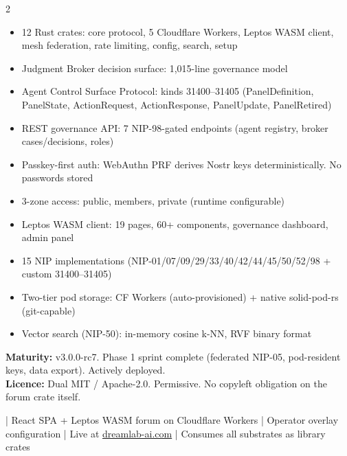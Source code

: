 \documentclass[10pt,a4paper]{article}
\begin{document}
\begin{multicols}{2}
{\color{gold}\faBalanceScale}\;\\[2pt]
{\small
\begin{itemize}[leftmargin=8pt,itemsep=0pt,parsep=0pt,topsep=1pt,label={\color{gold}\textbullet}]
  \item 12 Rust crates: core protocol, 5 Cloudflare Workers, Leptos WASM client, mesh federation, rate limiting, config, search, setup
  \item Judgment Broker decision surface: 1,015-line governance model
  \item Agent Control Surface Protocol: kinds 31400--31405 (PanelDefinition, PanelState, ActionRequest, ActionResponse, PanelUpdate, PanelRetired)
  \item REST governance API: 7 NIP-98-gated endpoints (agent registry, broker cases/decisions, roles)
  \item Passkey-first auth: WebAuthn PRF derives Nostr keys deterministically. No passwords stored
  \item 3-zone access: public, members, private (runtime configurable)
  \item Leptos WASM client: 19 pages, 60+ components, governance dashboard, admin panel
  \item 15 NIP implementations (NIP-01/07/09/29/33/40/42/44/45/50/52/98 + custom 31400--31405)
  \item Two-tier pod storage: CF Workers (auto-provisioned) + native solid-pod-rs (git-capable)
  \item Vector search (NIP-50): in-memory cosine k-NN, RVF binary format
\end{itemize}
\textbf{Maturity:} v3.0.0-rc7. Phase 1 sprint complete (federated NIP-05, pod-resident keys, data export). Actively deployed.\\
\textbf{Licence:} Dual MIT / Apache-2.0. Permissive. No copyleft obligation on the forum crate itself.
}

\end{multicols}

\vspace{2pt}
{\color{crimson}\faGlobe}\; {\small\color{textmuted}| React SPA + Leptos WASM forum on Cloudflare Workers | Operator overlay configuration | Live at \href{https://dreamlab-ai.com}{dreamlab-ai.com} | Consumes all substrates as library crates}
\end{document}
